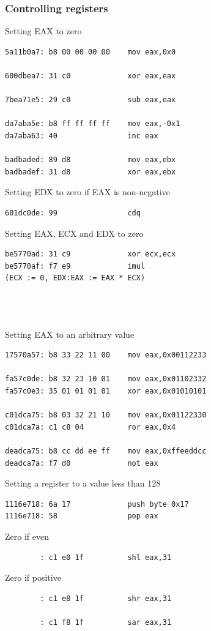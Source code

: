 \documentclass[slidestop,compress,mathserif, xcolor=table]{beamer}
\begin{document}
\begin{frame}[fragile]
  \frametitle{Controlling registers}

  \tiny
  \begin{multicols}{2}
    Setting EAX to zero
\begin{verbatim}
5a11b0a7: b8 00 00 00 00    mov eax,0x0

600dbea7: 31 c0             xor eax,eax

7bea71e5: 29 c0             sub eax,eax

da7aba5e: b8 ff ff ff ff    mov eax,-0x1
da7aba63: 40                inc eax

badbaded: 89 d8             mov eax,ebx
badbadef: 31 d8             xor eax,ebx
\end{verbatim}
    Setting EDX to zero if EAX is non-negative
\begin{verbatim}
601dc0de: 99                cdq
\end{verbatim}
    Setting EAX, ECX and EDX to zero
\begin{verbatim}
be5770ad: 31 c9             xor ecx,ecx
be5770af: f7 e9             imul
(ECX := 0, EDX:EAX := EAX * ECX)




\end{verbatim}
    Setting EAX to an arbitrary value
\begin{verbatim}
17570a57: b8 33 22 11 00    mov eax,0x00112233

fa57c0de: b8 32 23 10 01    mov eax,0x01102332
fa57c0e3: 35 01 01 01 01    xor eax,0x01010101

c01dca75: b8 03 32 21 10    mov eax,0x01122330
c01dca7a: c1 c8 04          ror eax,0x4

deadca75: b8 cc dd ee ff    mov eax,0xffeeddcc
deadca7a: f7 d0             not eax
\end{verbatim}
    Setting a register to a value less than 128
\begin{verbatim}
1116e718: 6a 17             push byte 0x17
1116e718: 58                pop eax
\end{verbatim}
    Zero if even
\begin{verbatim}
        : c1 e0 1f          shl eax,31
\end{verbatim}
    Zero if positive
\begin{verbatim}
        : c1 e8 1f          shr eax,31

        : c1 f8 1f          sar eax,31
\end{verbatim}
  \end{multicols}
\end{frame}
\end{document}
